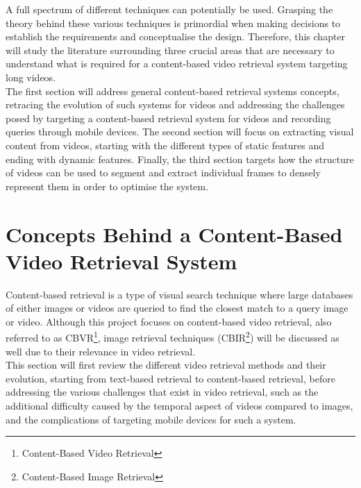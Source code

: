 A full spectrum of different techniques can potentially be used. Grasping the theory behind these various techniques is primordial when making decisions to establish the requirements and conceptualise the design. Therefore, this chapter will study the literature surrounding three crucial areas that are necessary to understand what is required for a content-based video retrieval system targeting long videos.\\

The first section will address general content-based retrieval systems concepts, retracing the evolution of such systems for videos and addressing the challenges posed by targeting a content-based retrieval system for videos and recording queries through mobile devices. The second section will focus on extracting visual content from videos, starting with the different types of static features and ending with dynamic features. Finally, the third section targets how the structure of videos can be used to segment and extract individual frames to densely represent them in order to optimise the system.

\section{Concepts Behind a Content-Based Video Retrieval System}

Content-based retrieval is a type of visual search technique where large databases of either images or videos are queried to find the closest match to a query image or video. Although this project focuses on content-based video retrieval, also referred to as CBVR\footnote{Content-Based Video Retrieval}, image retrieval techniques (CBIR\footnote{Content-Based Image Retrieval}) will be discussed as well due to their relevance in video retrieval.\\

This section will first review the different video retrieval methods and their evolution, starting from text-based retrieval to content-based retrieval, before addressing the various challenges that exist in video retrieval, such as the additional difficulty caused by the temporal aspect of videos compared to images, and the complications of targeting mobile devices for such a system.


